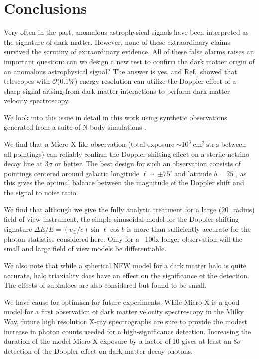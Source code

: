 \documentclass[aps,prd,10pt,twocolumn,superscriptaddress,showpacs]{revtex4-1}
\newcommand{\units}[1]{~\mathrm{#1}}
\begin{document}
\section{Conclusions}
\label{sec:conclusions}

Very often in the past, anomalous astrophysical signals have been interpreted as the signature of dark matter.  However, none of these extraordinary claims survived the scrutiny of extraordinary evidence.  All of these false alarms raises an important question:  can we design a new test to confirm the dark matter origin of an anomalous astrophysical signal?  The answer is yes, and Ref.\,\cite{speckhard2016} showed that telescopes with $\mathcal{O}$(0.1\%) energy resolution can utilize the Doppler effect of a sharp signal arising from dark matter interactions to perform dark matter velocity spectroscopy.

We look into this issue in detail in this work using synthetic observations generated from a suite
of N-body simulations \cite{mao2015}.

We find that a Micro-X-like observation (total
exposure $\sim10^3\units{cm^2~str~s}$ between all pointings) can reliably confirm the Doppler
shifting effect on a sterile netrino decay line at $3\sigma$ or better. The best design for such an
observation consists of pointings centered around galactic longitude $\ell\sim\pm75^\circ$ and
latitude $b=25^\circ$, as this gives the optimal balance between the magnitude of the Doppler shift
and the signal to noise ratio.

We find that although we give the fully analytic treatment for a large ($20^\circ$ radius) field of
view instrument, the simple sinusoidal model for the Doppler shifting signature $\Delta E/E
= (v_\odot/c) \sin \ell \cos b$ is more than sufficiently accurate for the photon statistics
considered here. Only for a ~100x longer observation will the small and large field of view models
be differentiable.

We also note that while a spherical NFW model for a dark matter halo is quite accurate, halo
triaxiality does have an effect on the significance of the detection.  The effects of subhaloes are
also considered but found to be small.

We have cause for optimism for future experiments. While Micro-X is a good model for a first observation of dark matter velocity
spectroscopy in the Milky Way, future high resolution X-ray spectrographs are sure to provide the
modest increase in photon counts needed for a high-significance detection. Increasing the duration
of the model Micro-X exposure by a factor of 10 gives at least an $8\sigma$ detection of the Doppler
effect on dark matter decay photons.
\end{document}
